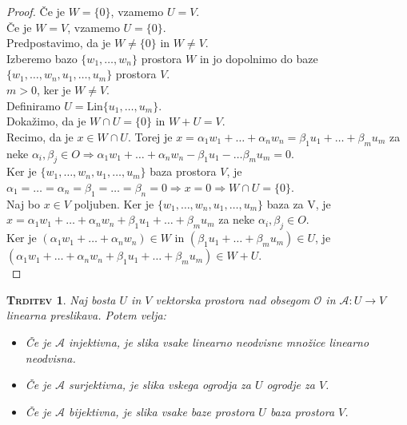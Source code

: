 \documentclass[a4paper,12pt]{article}
\newcommand{\A}{\mathcal{A}}
\newtheorem*{trditev}{\textsc{Trditev}}
\begin{document}
\begin{proof}
Če je $W=\{0\}$, vzamemo $U=V$. \\

Če je $W=V$, vzamemo $U=\{0\}$. \\

Predpostavimo, da je $W\neq \{0\}$ in $W\neq V$. \\

Izberemo bazo $\{w_1,\ldots,w_n\}$ prostora $W$ in jo dopolnimo do baze $\{w_1,\ldots,w_n,u_1,\ldots,u_m\}$ prostora $V$.\\

$m>0$, ker je $W\neq V$.\\

Definiramo $U=$Lin$\{u_1,\ldots,u_m\}$. \\

Dokažimo, da je $W\cap U=\{0\}$ in $W+U=V$.\\

Recimo, da je $x\in W \cap U$. Torej je $x=\alpha_1w_1+\ldots+\alpha_nw_n=\beta_1u_1+\ldots+\beta_mu_m$ za neke $\alpha_i,\beta_j\in O\Rightarrow \alpha_1w_1+\ldots+\alpha_nw_n-\beta_1u_1-\ldots\beta_mu_m=0$.\\

Ker je $\{w_1,\ldots,w_n,u_1,\ldots,u_m\}$ baza prostora $V$, je $\alpha_1=\ldots=\alpha_n=\beta_1=\ldots=\beta_n=0\Rightarrow x=0 \Rightarrow W \cap U=\{0\}$. \\

Naj bo $x\in V$ poljuben. Ker je $\{w_1,\ldots,w_n,u_1,\ldots,u_m\}$ baza za V, je  \linebreak 
$x=\alpha_1w_1+\ldots+\alpha_nw_n+\beta_1u_1+\ldots+\beta_mu_m$ za neke $\alpha_i,\beta_j\in O$. \\

Ker je $(\alpha_1w_1+\ldots+\alpha_nw_n)\in W$ in $(\beta_1u_1+\ldots+\beta_mu_m)\in U$, je \linebreak $(\alpha_1w_1+\ldots+\alpha_nw_n+\beta_1u_1+\ldots+\beta_mu_m)\in W+U$.\\
\end{proof}

\newpage 

\begin{trditev}
Naj bosta $U$ in $V$ vektorska prostora nad obsegom $\mathcal{O}$ in $\A :U\to V$ linearna preslikava. Potem velja:
\begin{itemize}
\item Če je $\A$ injektivna, je slika vsake linearno neodvisne množice linearno neodvisna.
\item Če je $\A$ surjektivna, je slika vskega ogrodja za $U$ ogrodje za $V$.
\item Če je $\A$ bijektivna, je slika vsake baze prostora $U$ baza prostora $V$.\\
\end{itemize}
\end{trditev}
\end{document}
